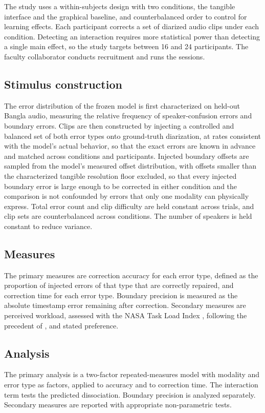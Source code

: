 \documentclass[10pt,a4paper,twocolumn]{article}
\begin{document}
The study uses a within-subjects design with two conditions, the
tangible interface and the graphical baseline, and counterbalanced
order to control for learning effects. Each participant corrects
a set of diarized audio clips under each condition. Detecting an
interaction requires more statistical power than detecting a
single main effect, so the study targets between 16 and 24
participants. The faculty collaborator conducts recruitment and
runs the sessions.

\subsection{Stimulus construction}
\label{sec:method-stimulus}

The error distribution of the frozen model is first characterized
on held-out Bangla audio, measuring the relative frequency of
speaker-confusion errors and boundary errors. Clips are then
constructed by injecting a controlled and balanced set of both
error types onto ground-truth diarization, at rates consistent
with the model's actual behavior, so that the exact errors are
known in advance and matched across conditions and participants.
Injected boundary offsets are sampled from the model's measured
offset distribution, with offsets smaller than the characterized
tangible resolution floor excluded, so that every injected
boundary error is large enough to be corrected in either condition
and the comparison is not confounded by errors that only one
modality can physically express.
Total error count and clip difficulty are held constant across
trials, and clip sets are counterbalanced across conditions. The
number of speakers is held constant to reduce variance.

\subsection{Measures}
\label{sec:method-measures}

The primary measures are correction accuracy for each error type,
defined as the proportion of injected errors of that type that
are correctly repaired, and correction time for each error type.
Boundary precision is measured as the absolute timestamp error
remaining after correction. Secondary measures are perceived
workload, assessed with the NASA Task Load Index
\citep{hart1988nasatlx}, following the precedent of
\citet{chandrasekera2015cogload}, and stated preference.

\subsection{Analysis}
\label{sec:method-analysis}

The primary analysis is a two-factor repeated-measures model with
modality and error type as factors, applied to accuracy and to
correction time. The interaction term tests the predicted
dissociation. Boundary precision is analyzed separately.
Secondary measures are reported with appropriate non-parametric
tests.


\end{document}

